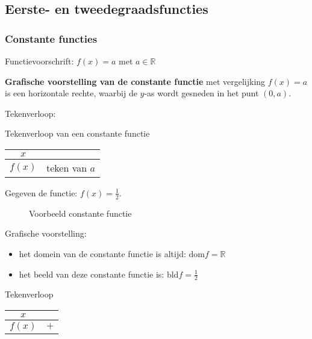 \subsection{Eerste- en tweedegraadsfuncties}
\label{sec:eerste_tweede}

\subsubsection{Constante functies}

\begin{definitie}
	Functievoorschrift: $f(x)=a$ met $a\in\mathbb{R}$
\end{definitie}


\textbf{Grafische voorstelling van de constante functie}
met vergelijking $f(x)=a$ is een horizontale rechte, waarbij de $y$-as
wordt gesneden in het punt $(0,a)$.


Tekenverloop: 

\begin{tabel}{Tekenverloop van een constante functie}
	\begin{tabular}{c||c}
		$x$ & \\
		\hline 
		$f(x)$ & teken van $a$\\
	\end{tabular}
	\label{tab:ct}
\end{tabel}


\begin{voorbeeld}
	Gegeven de functie: $f(x)=\frac{1}{2}$. 

\begin{figure}[h]
	\centering          
	
	\caption{Voorbeeld constante functie}
	\label{fig:constante_functie}	
\end{figure}
	
 
Grafische voorstelling:
\begin{itemize}
\item het domein van de constante functie is altijd: $\textrm{dom}f=\mathbb{R}$
\item het beeld van deze constante functie is: $\textrm{bld}f=\frac{1}{2}$
\end{itemize}

Tekenverloop

\begin{center}
\begin{tabular}{c||c}
	$x$ & \\
	\hline 
	$f(x)$ & $+$ \\
\end{tabular}	
\end{center}

\end{voorbeeld}

